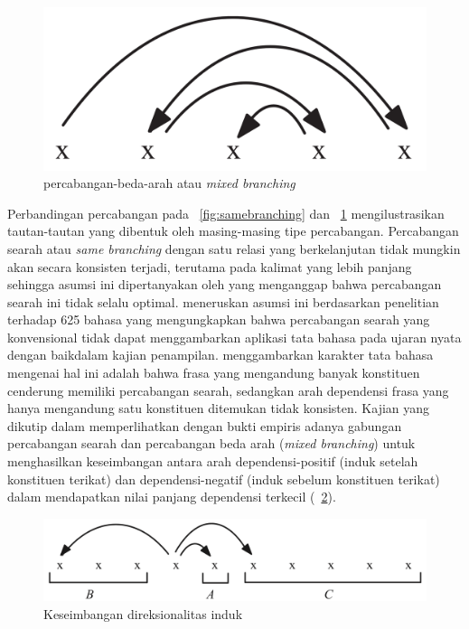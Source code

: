 \begin{figure}
	\centering \includegraphics[width=0.5
	\textwidth] {pics/mixedbranching.png} \caption{\Gls{percabangan-beda-arah} atau \textit{mixed branching}} 
\label{fig:mixedbranching} \end{figure}

Perbandingan percabangan pada \pic~\ref{fig:samebranching} dan \pic~\ref{fig:mixedbranching} mengilustrasikan tautan-tautan yang dibentuk oleh masing-masing tipe percabangan. Percabangan searah atau \textit{same branching} dengan satu relasi yang berkelanjutan tidak mungkin akan secara konsisten terjadi, terutama pada kalimat yang lebih panjang sehingga asumsi ini dipertanyakan oleh \cite{temperley2008dependency} yang menganggap bahwa percabangan searah ini tidak selalu optimal. \cite{temperley2008dependency} meneruskan asumsi ini berdasarkan penelitian \cite{dryer1992greenbergian} terhadap 625 bahasa yang mengungkapkan bahwa percabangan searah yang konvensional tidak dapat menggambarkan aplikasi tata bahasa pada ujaran nyata dengan baikdalam kajian penampilan. \cite{dryer1992greenbergian} menggambarkan karakter tata bahasa mengenai hal ini adalah bahwa frasa yang mengandung banyak konstituen cenderung memiliki percabangan searah, sedangkan arah dependensi frasa yang hanya mengandung satu konstituen ditemukan tidak konsisten. Kajian \cite{dryer1992greenbergian} yang dikutip dalam \cite{gildea2010grammars} memperlihatkan dengan bukti empiris adanya gabungan percabangan searah dan percabangan beda arah (\textit{mixed branching}) untuk menghasilkan keseimbangan antara arah \gls{dependensi-positif} (induk setelah konstituen terikat) dan \gls{dependensi-negatif} (induk sebelum konstituen terikat) dalam mendapatkan nilai panjang dependensi terkecil (\pic~\ref{fig:balancedbranching}).

\begin{figure}
	\centering \includegraphics[width=0.8
	\textwidth] {pics/balancedbranching.png} \caption{Keseimbangan direksionalitas induk} 
\label{fig:balancedbranching} \end{figure}

